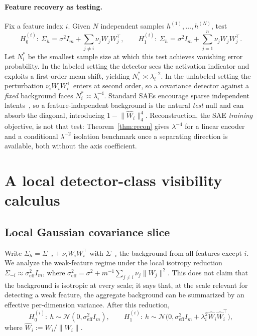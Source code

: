 \documentclass{article}
\theoremstyle{plain}
\newcommand{\Wihat}{\widehat{W}_i}
\newcommand{\sigeff}{\sigma_{\mathrm{eff}}}
\begin{document}
\paragraph{Feature recovery as testing.}
Fix a feature index $i$. Given $N$ independent samples $h^{(1)},\ldots,h^{(N)}$, test
\begin{equation}
H_0^{(i)}:\ \Sigma_h=\sigma^2 I_m+\sum_{j\neq i}\nu_j W_j W_j^{\top},
\qquad
H_1^{(i)}:\ \Sigma_h=\sigma^2 I_m+\sum_{j=1}^n \nu_j W_j W_j^{\top}.
\end{equation}
Let $N_i^*$ be the smallest sample size at which this test achieves vanishing error probability. In the labeled setting the detector sees the activation indicator and exploits a first-order mean shift, yielding $N_i^*\asymp\lambda_i^{-2}$. In the unlabeled setting the perturbation $\nu_i W_i W_i^{\top}$ enters at second order, so a covariance detector against a \emph{fixed} background faces $N_i^*\asymp\lambda_i^{-4}$. Standard SAEs encourage sparse independent latents~\citep{bricken2023towards,gao2025scaling}, so a feature-independent background is the natural \emph{test} null and can absorb the diagonal, introducing $1-\lVert \Wihat\rVert_4^4$. Reconstruction, the SAE \emph{training} objective, is not that test: Theorem~\ref{thm:recon} gives $\lambda^{-4}$ for a linear encoder and a conditional $\lambda^{-2}$ isolation benchmark once a separating direction is available, both without the axis coefficient.

\section{A local detector-class visibility calculus}
\label{sec:calculus}

\subsection{Local Gaussian covariance slice}
Write $\Sigma_h=\Sigma_{-i}+\nu_i W_i W_i^{\top}$ with $\Sigma_{-i}$ the background from all features except $i$. We analyze the weak-feature regime under the local isotropy reduction $\Sigma_{-i}\approx\sigeff^2 I_m$, where $\sigeff^2=\sigma^2+m^{-1}\sum_{j\neq i}\nu_j\lVert W_j\rVert^2$. This does not claim that the background is isotropic at every scale; it says that, at the scale relevant for detecting a weak feature, the aggregate background can be summarized by an effective per-dimension variance. After this reduction,
\begin{equation}
H_0^{(i)}:\ h\sim\mathcal{N}(0,\sigeff^2 I_m),\qquad
H_1^{(i)}:\ h\sim\mathcal{N}\bigl(0,\sigeff^2 I_m+\lambda_i^2 \Wihat\Wihat^{\top}\bigr),
\end{equation}
where $\Wihat:=W_i/\lVert W_i\rVert$.
\end{document}
